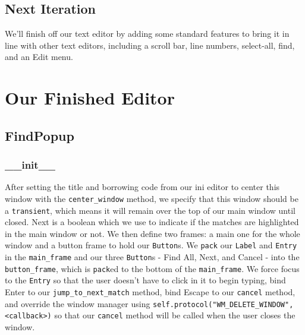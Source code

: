 \documentclass[a4paper,11pt,openany]{book}
\begin{document}
\subsection{Next Iteration}
We'll finish off our text editor by adding some standard features to bring it in line with other text editors, including a scroll bar, line numbers, select-all, find, and an Edit menu. 

\newpage

\section{Our Finished Editor}



\subsection{FindPopup}

\subsubsection{\_\_init\_\_}

After setting the title and borrowing code from our ini editor to center this window with the \lstinline[columns=fixed]{center_window} method, we specify that this window should be a \lstinline[columns=fixed]{transient}, which means it will remain over the top of our main window until closed. Next is a boolean which we use to indicate if the matches are highlighted in the main window or not. We then define two frames: a main one for the whole window and a button frame to hold our \lstinline[columns=fixed]{Button}s. We \lstinline[columns=fixed]{pack} our \lstinline[columns=fixed]{Label} and \lstinline[columns=fixed]{Entry} in the \lstinline[columns=fixed]{main_frame} and our three \lstinline[columns=fixed]{Button}s - Find All, Next, and Cancel - into the \lstinline[columns=fixed]{button_frame}, which is \lstinline[columns=fixed]{pack}ed to the bottom of the \lstinline[columns=fixed]{main_frame}. We force focus to the \lstinline[columns=fixed]{Entry} so that the user doesn't have to click in it to begin typing, bind Enter to our \lstinline[columns=fixed]{jump_to_next_match} method, bind Escape to our \lstinline[columns=fixed]{cancel} method, and override the window manager using \lstinline[columns=fixed]{self.protocol("WM_DELETE_WINDOW", <callback>)} so that our \lstinline[columns=fixed]{cancel} method will be called when the user closes the window. 
\end{document}
